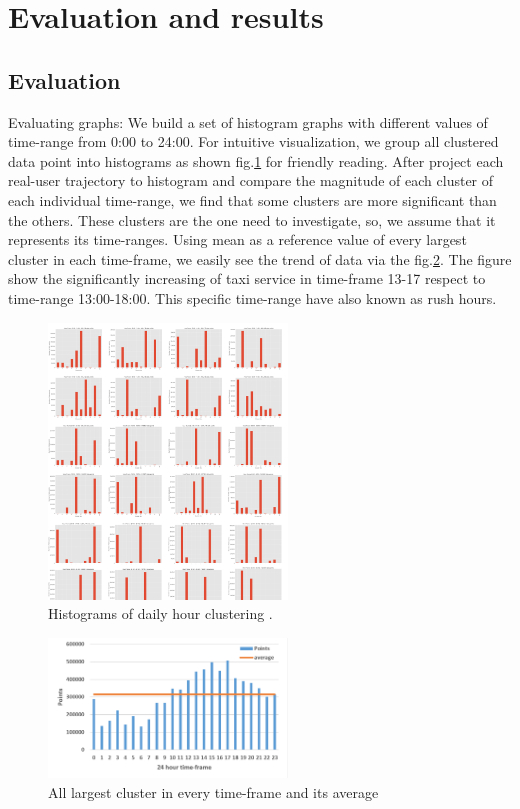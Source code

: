 \documentclass[journal]{IEEEtran}
\begin{document}
\section{Evaluation and results}
\subsection{Evaluation}
\label{subsection:evaluation}
Evaluating graphs: We build a set of histogram graphs with different values of time-range from 0:00 to 24:00. For intuitive visualization, we group all clustered data point into histograms as shown fig.\ref{fig_HistogramTotal} for friendly reading. After project each real-user trajectory to histogram and compare the magnitude of each cluster of each individual time-range, we find that some clusters are more significant than the others. These clusters are the one need to investigate, so, we assume that it represents its time-ranges. Using mean as a reference value of every largest cluster in each time-frame, we easily see the trend of data via the fig.\ref{fig_average}. The figure show the significantly increasing of taxi service in time-frame 13-17 respect to time-range 13:00-18:00. This specific time-range have also known as rush hours. 

\begin{figure}[!t]
	\centering
	\includegraphics[width=2.5in]{image/HistogramTotal.jpg}
	\caption{Histograms of daily hour clustering .}
	\label{fig_HistogramTotal}
\end{figure}

\begin{figure}[!t]
	\centering
	\includegraphics[width=2.5in]{image/average.png}
	\caption{All largest cluster in every time-frame and its average}
	\label{fig_average}
\end{figure}
\end{document}
